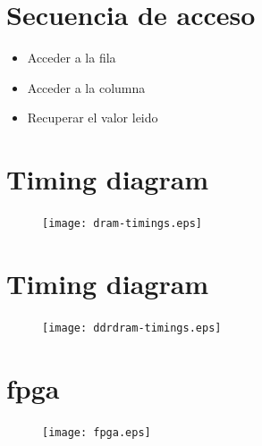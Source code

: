 \documentclass{beamer}
\begin{document}
\section{Secuencia de acceso}
\begin{frame}
	\begin{itemize}
		\item Acceder a la fila
		\item Acceder a la columna
		\item Recuperar el valor leido
	\end{itemize}
\end{frame}

\section{Timing diagram}
\begin{frame}
\begin{figure}[!htb]
\centering
\texttt{[image: dram-timings.eps]}
\end{figure}
\end{frame}

\section{Timing diagram}
\begin{frame}
\begin{figure}[!htb]
\centering
\texttt{[image: ddrdram-timings.eps]}
\end{figure}
\end{frame}

\section{fpga}
\begin{frame}
\begin{figure}[!htb]
\centering
\texttt{[image: fpga.eps]}
\end{figure}
\end{frame}
\end{document}
